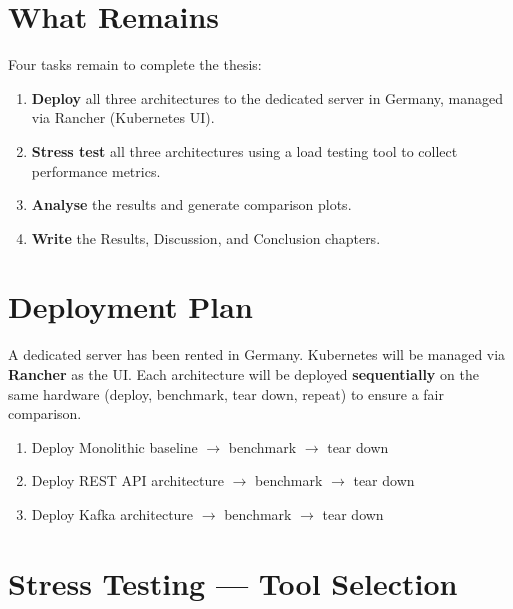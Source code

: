 \documentclass[12pt,a4paper]{article}
\begin{document}
\section{What Remains}

Four tasks remain to complete the thesis:

\begin{enumerate}
  \item \textbf{Deploy} all three architectures to the dedicated server in Germany, managed via Rancher (Kubernetes UI).
  \item \textbf{Stress test} all three architectures using a load testing tool to collect performance metrics.
  \item \textbf{Analyse} the results and generate comparison plots.
  \item \textbf{Write} the Results, Discussion, and Conclusion chapters.
\end{enumerate}

\section{Deployment Plan}

A dedicated server has been rented in Germany. Kubernetes will be managed via \textbf{Rancher} as the UI. Each architecture will be deployed \textbf{sequentially} on the same hardware (deploy, benchmark, tear down, repeat) to ensure a fair comparison.

\begin{enumerate}[nosep]
  \item Deploy Monolithic baseline $\rightarrow$ benchmark $\rightarrow$ tear down
  \item Deploy REST API architecture $\rightarrow$ benchmark $\rightarrow$ tear down
  \item Deploy Kafka architecture $\rightarrow$ benchmark $\rightarrow$ tear down
\end{enumerate}

\section{Stress Testing --- Tool Selection}
\end{document}
